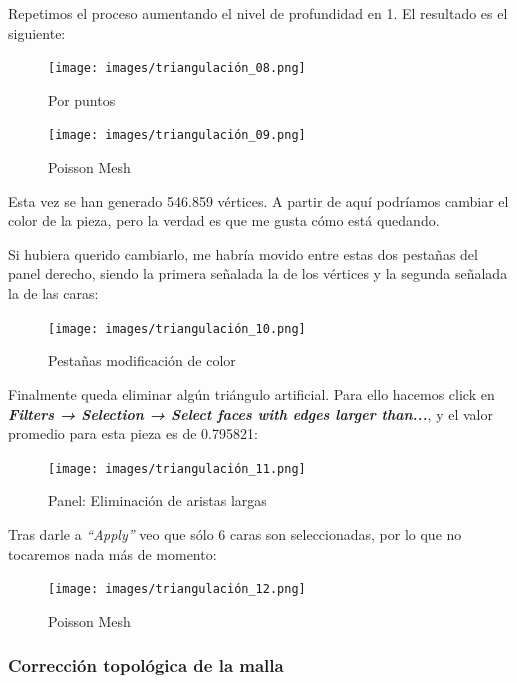 \documentclass[options]{article}
\begin{document}
\pagebreak

Repetimos el proceso aumentando el nivel de profundidad en 1. El resultado es el siguiente:
\begin{figure}[H]
    \centering 
    \texttt{[image: images/triangulación\_08.png]} \\
    \caption{Por puntos}
\end{figure}
\begin{figure}[H]
    \centering 
    \texttt{[image: images/triangulación\_09.png]} \\
    \caption{Poisson Mesh}
\end{figure}

\pagebreak
Esta vez se han generado 546.859 vértices. A partir de aquí podríamos cambiar el color de la pieza, pero la verdad es que me gusta cómo está quedando. 

Si hubiera querido cambiarlo, me habría movido entre estas dos pestañas del panel derecho, siendo la primera señalada la de los vértices y la segunda señalada la de las caras:

\begin{figure}[H]
    \centering 
    \texttt{[image: images/triangulación\_10.png]} \\
    \caption{Pestañas modificación de color}
\end{figure}

\pagebreak
Finalmente queda eliminar algún triángulo artificial. Para ello hacemos click en \textbf{\textit{Filters → Selection → Select faces with edges larger than...}}, y el valor promedio para esta pieza es de 0.795821:

\begin{figure}[H]
    \centering 
    \texttt{[image: images/triangulación\_11.png]} \\
    \caption{Panel: Eliminación de aristas largas}
\end{figure}


Tras darle a \textit{``Apply''} veo que sólo 6 caras son seleccionadas, por lo que no tocaremos nada más de momento:

\begin{figure}[H]
    \centering 
    \texttt{[image: images/triangulación\_12.png]} \\
    \caption{Poisson Mesh}
\end{figure}

\subsubsection{Corrección topológica de la malla}
\end{document}
